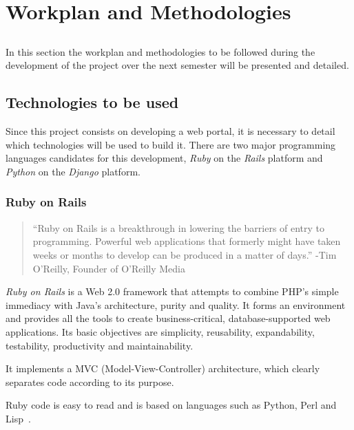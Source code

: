 \chapter{Workplan and Methodologies}\label{chap:chap3}

\section*{}

In this section the workplan and methodologies to be followed during the development of the project over the next semester will be presented and detailed.

\section{Technologies to be used}\label{tech}

Since this project consists on developing a web portal, it is necessary to detail which technologies will be used to build it.
There are two major programming languages candidates for this development, \textit{Ruby} on the \textit{Rails} platform and \textit{Python} on the \textit{Django} platform.


\subsection{Ruby on Rails}\label{tech:ror}

\begin{quote}
“Ruby on Rails is a breakthrough in lowering the barriers of entry to programming.
Powerful web applications that formerly might have taken weeks or months
to develop can be produced in a matter of days.”
-Tim O'Reilly, Founder of O'Reilly Media \cite{rubyonrails}
\end{quote}

\textit{Ruby on Rails} is a Web 2.0 framework that attempts to combine PHP's simple immediacy with Java's architecture, purity and quality. It forms an environment and provides all the tools to create business-critical, database-supported web applications. Its basic objectives are simplicity, reusability, expandability, testability, productivity and maintainability.

It implements a MVC (Model-View-Controller) architecture, which clearly separates code according to its purpose.

Ruby code is easy to read and is based on languages such as Python, Perl and Lisp~\cite{ror}.

